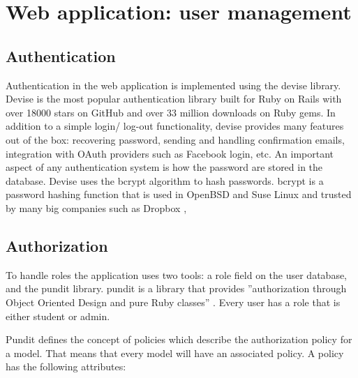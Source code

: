 \section{Web application: user management}
\subsection{Authentication}
Authentication in the web application is implemented using the devise library. Devise is the most popular authentication library built for Ruby on Rails with over 18000 stars on GitHub and over 33 million downloads on Ruby gems. In addition to a simple login/ log-out functionality, devise provides many features out of the box: recovering password, sending and handling confirmation emails, integration with OAuth providers such as Facebook login, etc. An important aspect of any authentication system is how the password are stored in the database. Devise uses the bcrypt algorithm to hash passwords. bcrypt is a password hashing function \citep{wiki:bcrypt} that is used in OpenBSD and Suse Linux and trusted by many big companies such as Dropbox \citep{dropbox:authentication},

\subsection{Authorization}
To handle roles the application uses two tools: a role field on the user database, and the pundit library. pundit is a library that provides ''authorization through Object Oriented Design and pure Ruby classes'' \citep{github:pundit}. Every user has a role that is either student or admin.

Pundit defines the concept of policies which describe the authorization policy for a model. That means that every model will have an associated policy. A policy has the following attributes:

